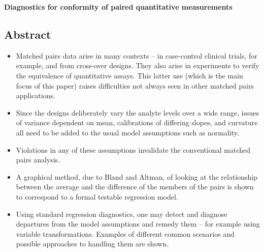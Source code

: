 
\noindent \textbf{Diagnostics for conformity of paired quantitative measurements}

\subsection*{Abstract}
\begin{itemize}
\item Matched pairs data arise in many contexts – in case-control clinical trials, for example, and from cross-over designs. They also arise in experiments to verify the equivalence of quantitative assays. This latter use (which is the main focus of this paper) raises difficulties not always seen in other matched pairs applications. 

\item Since the designs deliberately vary the analyte levels over a wide range, issues of variance dependent on mean, calibrations of differing slopes, and curvature all need to be added to the usual model assumptions such as normality. 

\item Violations in any of these assumptions invalidate the conventional matched pairs analysis. 

\item A graphical method, due to Bland and Altman, of looking at the relationship between the average and the difference of the members of the pairs is shown to correspond to a formal testable regression model. 

\item Using standard regression diagnostics, one may detect and diagnose departures from the model assumptions and remedy them – for example using variable transformations. Examples of different common scenarios and possible approaches to handling them are shown.
\end{itemize}



